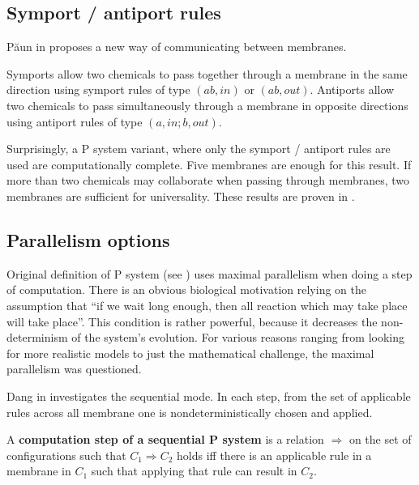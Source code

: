 
\subsection{Symport / antiport rules} %
\label{sub:symport_antiport_rules}

P\u{a}un in \cite{Paun:2002:SymportAntiport} proposes a new way of communicating between membranes.

Symports allow two chemicals to pass together through a membrane in the same direction using symport rules of type $(ab,in)$ or $(ab,out)$.
Antiports allow two chemicals to pass simultaneously through a membrane in opposite directions using antiport rules of type $(a,in;b,out)$.

Surprisingly, a P system variant, where only the symport / antiport rules are used are computationally complete. Five membranes are enough for this result. If more than two chemicals may collaborate when passing through membranes, two membranes are sufficient for universality. These results are proven in \cite{Paun:2002:SymportAntiport}.


\subsection{Parallelism options} %
\label{sub:parallelism_options}

Original definition of P system (see \cite{Paun98}) uses maximal parallelism when doing a step of computation. There is an obvious biological motivation relying on the assumption that ``if we wait long enough, then all reaction which may take place will take place''. This condition is rather powerful, because it decreases the non-determinism of the system's evolution. For various reasons ranging from looking for more realistic models to just the mathematical challenge, the maximal parallelism was questioned.


Dang in \cite{Dang04Sequential} investigates the sequential mode. In each step, from the set of applicable rules across all membrane one is nondeterministically chosen and applied.

\begin{definition}
  \label{def:computation_step_of_a_sequential_P_system}
  A {\bf computation step of a sequential P system} is a relation $\Rightarrow$ on the set of configurations such that $C_1 \Rightarrow C_2$ holds iff there is an applicable rule in a membrane in $C_1$ such that applying that rule can result in $C_2$.
\end{definition}

